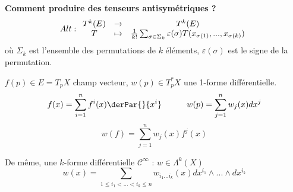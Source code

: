 \textbf{Comment produire des tenseurs antisymétriques ?}\\
\[Alt :\begin{array}{c c c}
	T^k(E)&\to& T^k(E)\\
	T&\mapsto& \frac{1}{k!} \sum_{\sigma\in\Sigma_k} \varepsilon(\sigma) T(x_{\sigma(1)},...,x_{\sigma(k)})
\end{array}\]
où $\Sigma_k$ est l'ensemble des permutations de $k$ éléments, $\varepsilon(\sigma)$ est le signe de la permutation.







$f(p)\in E=T_pX$ champ vecteur, $w(p)\in T^*_p X$ une 1-forme différentielle.
\[f(x)=\sum_{i=1}^n f^i(x) \derPar{}{x^i} \hspace{3em} w(p)=\sum_{j=1}^n w_j(x) dx^j\]
\[w(f)=\sum_{j=1}^n w_j(x)f^j(x)\]

De même, une $k$-forme différentielle $\mathcal{C}^\infty$ : $w\in\Lambda^k(X)$
\[w(x)=\sum_{1\leq i_1<...<i_k\leq n} w_{i_1...i_k}(x)dx^{i_1}\wedge...\wedge dx^{i_k}\]

